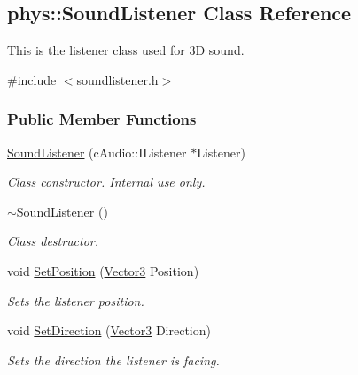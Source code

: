 \hypertarget{classphys_1_1SoundListener}{
\subsection{phys::SoundListener Class Reference}
\label{d1/d5a/classphys_1_1SoundListener}
}


This is the listener class used for 3D sound.  




{\ttfamily \#include $<$soundlistener.h$>$}

\subsubsection*{Public Member Functions}
\begin{DoxyCompactItemize}
\item 
\hyperlink{classphys_1_1SoundListener_ab4063bdd8b0bc654a416915354ed0312}{SoundListener} (cAudio::IListener $\ast$Listener)
\begin{DoxyCompactList}\small\item\em Class constructor. Internal use only. \item\end{DoxyCompactList}\item 
\hyperlink{classphys_1_1SoundListener_ab32dd020228ca0e09271f988d3a2e7f9}{$\sim$SoundListener} ()
\begin{DoxyCompactList}\small\item\em Class destructor. \item\end{DoxyCompactList}\item 
void \hyperlink{classphys_1_1SoundListener_ab2a679aaf18c646365285c8691ffcb0c}{SetPosition} (\hyperlink{classphys_1_1Vector3}{Vector3} Position)
\begin{DoxyCompactList}\small\item\em Sets the listener position. \item\end{DoxyCompactList}\item 
void \hyperlink{classphys_1_1SoundListener_ad4ba93b650897e355c26b09e3f95bce0}{SetDirection} (\hyperlink{classphys_1_1Vector3}{Vector3} Direction)
\begin{DoxyCompactList}\small\item\em Sets the direction the listener is facing. \item\end{DoxyCompactList}\item 

\end{DoxyCompactItemize}
